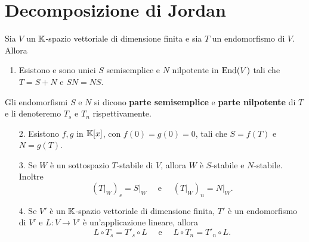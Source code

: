















\section{Decomposizione di Jordan}
\begin{proposition}\label{PrDecomposizioneSemisempliceNilpotente}
    Sia $V$ un $\mathbb{K}$-spazio vettoriale di dimensione finita e sia $T$ un endomorfismo di $V$. Allora \begin{enumerate}
        \item Esistono e sono unici $S$ semisemplice e $N$ nilpotente in $\operatorname{End}(V)$ tali che $T=S+N$ e $SN=NS$.
    \end{enumerate}
    Gli endomorfismi $S$ e $N$ si dicono \textbf{parte semisemplice} e \textbf{parte nilpotente} di $T$ e li denoteremo $T_s$ e $T_n$ rispettivamente. 
    \begin{enumerate}
        \item[2.] Esistono $f,g$ in $\mathbb{K}[x]$, con $f(0)=g(0)=0$, tali che $S=f(T)$ e $N=g(T)$.
        \item[3.] Se $W$ è un sottospazio $T$-stabile di $V$, allora $W$ è $S$-stabile e $N$-stabile. Inoltre \[\left(\left.T\right|_{W}\right)_s=\left.S\right|_{W} \quad \text{ e } \quad \left(\left.T\right|_{W}\right)_n=\left.N\right|_{W}.\]
        \item[4.] Se $V'$ è un $\mathbb{K}$-spazio vettoriale di dimensione finita, $T'$ è un endomorfismo di $V'$ e $L\colon V \to V'$ è un'applicazione lineare, allora \[L\circ T_s = T'_s\circ L \quad \text{ e } \quad L\circ T_n = T'_n\circ L.\]
    \end{enumerate}
\end{proposition}

